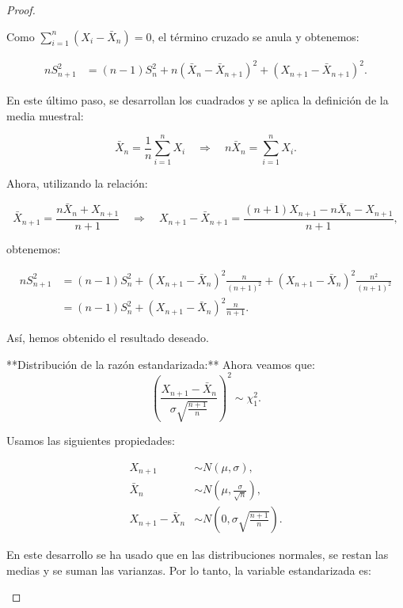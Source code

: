 \begin{proof}
\begin{enumerate}
			  Como $\sum_{i=1}^{n} \left(X_{i} - \bar{X}_{n} \right) = 0$, el término cruzado se anula y obtenemos:
		  
			  \begin{align*}
				  n S_{n+1}^{2} &= (n-1) S_{n}^{2} + n \left(\bar{X}_{n} - \bar{X}_{n+1} \right)^{2} + \left(X_{n+1} - \bar{X}_{n+1} \right)^{2}.
			  \end{align*}
		  
			  En este último paso, se desarrollan los cuadrados y se aplica la definición de la media muestral:
		  
			  $$
			  \bar{X}_{n} = \frac{1}{n} \sum_{i=1}^{n} X_{i} \quad \Longrightarrow \quad n \bar{X}_{n} = \sum_{i=1}^{n} X_{i}.
			  $$
		  
			  Ahora, utilizando la relación:
		  
			  $$
			  \bar{X}_{n+1} = \frac{n \bar{X}_{n} + X_{n+1}}{n+1} \quad \Longrightarrow \quad X_{n+1} - \bar{X}_{n+1} = \frac{(n+1)X_{n+1} - n\bar{X}_{n} - X_{n+1}}{n+1},
			  $$
		  
			  obtenemos:
		  
			  \begin{align*}
				  n S_{n+1}^{2} &= (n-1) S_{n}^{2} + \left(X_{n+1} - \bar{X}_{n} \right)^{2} \frac{n}{(n+1)^2} + \left(X_{n+1} - \bar{X}_{n} \right)^{2} \frac{n^2}{(n+1)^2} \\
								&= (n-1) S_{n}^{2} + \left(X_{n+1} - \bar{X}_{n} \right)^{2} \frac{n}{n+1}.
			  \end{align*}
		  
			  Así, hemos obtenido el resultado deseado.
		  
			  **Distribución de la razón estandarizada:**  
			  Ahora veamos que:
			  $$
			  \left(\frac{X_{n+1} - \bar{X}_{n}}{\sigma \sqrt{\frac{n+1}{n}}} \right)^2 \sim \chi_1^2.
			  $$
		  
			  Usamos las siguientes propiedades:
		  
			  \begin{align*}
				  X_{n+1} &\sim N(\mu, \sigma), \\
				  \bar{X}_n &\sim N\left(\mu, \frac{\sigma}{\sqrt{n}}\right), \\
				  X_{n+1} - \bar{X}_n &\sim N\left(0, \sigma \sqrt{\frac{n+1}{n}} \right).
			  \end{align*}
		  
			  En este desarrollo se ha usado que en las distribuciones normales, se restan las medias y se suman las varianzas.
			  Por lo tanto, la variable estandarizada es:
		  

\end{enumerate}
\end{proof}
